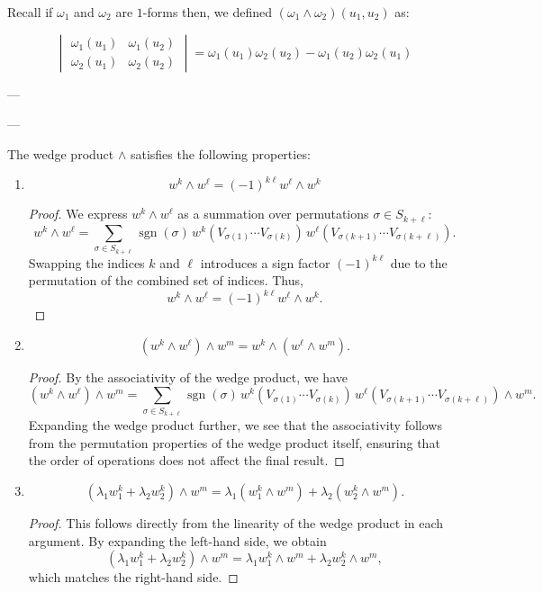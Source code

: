 \documentclass[11pt]{article}
\theoremstyle{definition}
\theoremstyle{remark}
\begin{document}
Recall if $\omega_1$ and $\omega_2$ are $1$-forms then, we defined $(\omega_1 \wedge \omega_2)(u_1, u_2)$ as:

\[
\begin{vmatrix}
\omega_1(u_1) & \omega_1(u_2) \\
\omega_2(u_1) & \omega_2(u_2)
\end{vmatrix}
= \omega_1(u_1)\omega_2(u_2) - \omega_1(u_2)\omega_2(u_1)
\]

---

---

The wedge product $\wedge$ satisfies the following properties:

\begin{enumerate}
    \item
    \[
    w^k \wedge w^\ell = (-1)^{k\ell} w^\ell \wedge w^k
    \]

    \begin{proof}
    We express $w^k \wedge w^\ell$ as a summation over permutations $\sigma \in S_{k+\ell}$:
    \[
    w^k \wedge w^\ell = \sum_{\sigma \in S_{k+\ell}} \operatorname{sgn}(\sigma) \, w^k(V_{\sigma(1)} \cdots V_{\sigma(k)}) \, w^\ell(V_{\sigma(k+1)} \cdots V_{\sigma(k+\ell)}).
    \]
    Swapping the indices $k$ and $\ell$ introduces a sign factor $(-1)^{k\ell}$ due to the permutation of the combined set of indices. Thus,
    \[
    w^k \wedge w^\ell = (-1)^{k\ell} w^\ell \wedge w^k.
    \]
    \end{proof}

    \item
    \[
    (w^k \wedge w^\ell) \wedge w^m = w^k \wedge (w^\ell \wedge w^m).
    \]

    \begin{proof}
    By the associativity of the wedge product, we have
    \[
    (w^k \wedge w^\ell) \wedge w^m = \sum_{\sigma \in S_{k+\ell}} \operatorname{sgn}(\sigma) \, w^k(V_{\sigma(1)} \cdots V_{\sigma(k)}) \, w^\ell(V_{\sigma(k+1)} \cdots V_{\sigma(k+\ell)}) \wedge w^m.
    \]
    Expanding the wedge product further, we see that the associativity follows from the permutation properties of the wedge product itself, ensuring that the order of operations does not affect the final result.
    \end{proof}

    \item
    \[
    (\lambda_1 w_1^k + \lambda_2 w_2^k) \wedge w^m = \lambda_1 (w_1^k \wedge w^m) + \lambda_2 (w_2^k \wedge w^m).
    \]

    \begin{proof}
    This follows directly from the linearity of the wedge product in each argument. By expanding the left-hand side, we obtain
    \[
    (\lambda_1 w_1^k + \lambda_2 w_2^k) \wedge w^m = \lambda_1 w_1^k \wedge w^m + \lambda_2 w_2^k \wedge w^m,
    \]
    which matches the right-hand side.
    \end{proof}
\end{enumerate}
\end{document}
